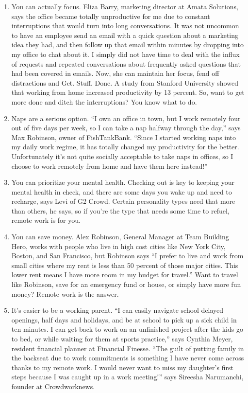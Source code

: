 \documentclass[]{book}
\begin{document}
\begin{enumerate}
\def\labelenumi{\arabic{enumi}.}
\item
  You can actually focus. Eliza Barry, marketing director at Amata Solutions, says the office became totally unproductive for me due to constant interruptions that would turn into long conversations. It was not uncommon to have an employee send an email with a quick question about a marketing idea they had, and then follow up that email within minutes by dropping into my office to chat about it. I simply did not have time to deal with the influx of requests and repeated conversations about frequently asked questions that had been covered in emails. Now, she can maintain her focus, fend off distractions and Get. Stuff. Done. A study from Stanford University showed that working from home increased productivity by 13 percent. So, want to get more done and ditch the interruptions? You know what to do.
\item
  Naps are a serious option. ``I own an office in town, but I work remotely four out of five days per week, so I can take a nap halfway through the day,'' says Max Robinson, owner of FishTankBank. ``Since I started working naps into my daily work regime, it has totally changed my productivity for the better. Unfortunately it's not quite socially acceptable to take naps in offices, so I choose to work remotely from home and have them here instead!''
\item
  You can prioritize your mental health. Checking out is key to keeping your mental health in check, and there are some days you wake up and need to recharge, says Levi of G2 Crowd. Certain personality types need that more than others, he says, so if you're the type that needs some time to refuel, remote work is for you.
\item
  You can save money. Alex Robinson, General Manager at Team Building Hero, works with people who live in high cost cities like New York City, Boston, and San Francisco, but Robinson says ``I prefer to live and work from small cities where my rent is less than 50 percent of those major cities. This lower rent means I have more room in my budget for travel.'' Want to travel like Robinson, save for an emergency fund or house, or simply have more fun money? Remote work is the answer.
\item
  It's easier to be a working parent. ``I can easily navigate school delayed openings, half days and holidays, and be at school to pick up a sick child in ten minutes. I can get back to work on an unfinished project after the kids go to bed, or while waiting for them at sports practice,'' says Cynthia Meyer, resident financial planner at Financial Finesse. ``The guilt of putting family in the backseat due to work commitments is something I have never come across thanks to my remote work. I would never want to miss my daughter's first steps because I was caught up in a work meeting!'' says Sireesha Narumanchi, founder at Crowdworknews.

\end{enumerate}
\end{document}
